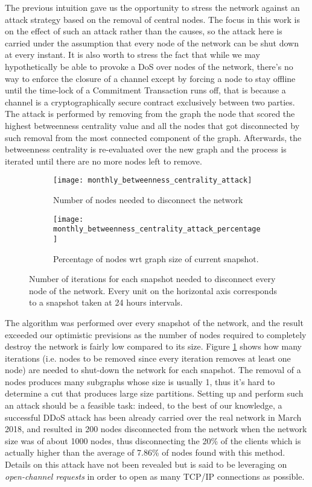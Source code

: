 	The previous intuition gave us the opportunity to stress the network against an attack strategy based on the removal of central nodes. The focus in this work is on the effect of such an attack rather than the causes, so the attack here is carried under the assumption that every node of the network can be shut down at every instant. It is also worth to stress the fact that while we may hypothetically be able to provoke a DoS over nodes of the network, there's no way to enforce the closure of a channel except by forcing a node to stay offline until the time-lock of a Commitment Transaction runs off, that is because a channel is a cryptographically secure contract exclusively between two parties. The attack is performed by removing from the graph the node that scored the highest betweenness centrality value and all the nodes that got disconnected by such removal from the most connected component of the graph. Afterwards, the betweenness centrality is re-evaluated over the new graph and the process is iterated until there are no more nodes left to remove. 
	
	\begin{figure}[h]
		\centering
		\begin{subfigure}{0.7\textwidth}
			\centering
			\texttt{[image: monthly\_betweenness\_centrality\_attack]}
			\caption{Number of nodes needed to disconnect the network}
		\end{subfigure}
		\begin{subfigure}{0.7\textwidth}
			\centering
			\texttt{[image: monthly\_betweenness\_centrality\_attack\_percentage]}
			\caption{Percentage of nodes wrt graph size of current snapshot.}
		\end{subfigure}
		\caption{Number of iterations for each snapshot needed to disconnect every node of the network. Every unit on the horizontal axis corresponds to a snapshot taken at 24 hours intervals.}
		\label{betweenness_attack}
	\end{figure}
	
	The algorithm was performed over every snapshot of the network, and the result exceeded our optimistic previsions as the number of nodes required to completely destroy the network is fairly low compared to its size. Figure \ref{betweenness_attack} shows	how many iterations (i.e. nodes to be removed since every iteration removes at least one node) are needed to shut-down the network for each snapshot. The removal of a nodes produces many subgraphs whose size is usually 1, thus it's hard to determine a cut that produces large size partitions. Setting up and perform such an attack should be a feasible task: indeed, to the best of our knowledge, a successful DDoS attack has been already carried over the real network in March 2018, and resulted in 200 nodes disconnected from the network when the network size was of about 1000 nodes, thus disconnecting the 20\% of the clients which is actually higher than the average of 7.86\% of nodes found with this method. Details on this attack have not been revealed but is said to be leveraging on \textit{open-channel requests} in order to open as many TCP/IP connections as possible.
	
